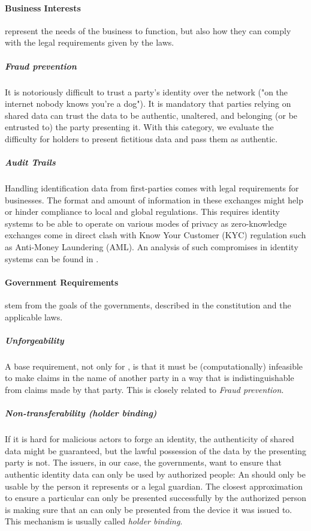 \paragraph{Business Interests} represent the needs of the business to function, but also how they can comply with the legal requirements given by the laws.

\subparagraph{Fraud prevention} It is notoriously difficult to trust a party's identity over the network ("on the internet nobody knows you're a dog"). It is mandatory that parties relying on shared data can trust the data to be authentic, unaltered, and belonging (or be entrusted to) the party presenting it. With this category, we evaluate the difficulty for holders to present fictitious data and pass them as authentic.

\subparagraph{Audit Trails} Handling identification data from first-parties comes with legal requirements for businesses. The format and amount of information in these exchanges might help or hinder compliance to local and global regulations. This requires identity systems to be able to operate on various modes of privacy as zero-knowledge exchanges come in direct clash with Know Your Customer (KYC) regulation such as Anti-Money Laundering (AML). An analysis of such compromises in identity systems can be found in \cite{ABCD25}.

\paragraph{Government Requirements} stem from the goals of the governments, described in the constitution and the applicable laws.

\subparagraph{Unforgeability} A base requirement, not only for \eid, is that it must be (computationally) infeasible to make claims in the name of another party in a way that is indistinguishable from claims made by that party. This is closely related to \emph{Fraud prevention}.

\subparagraph{Non-transferability (holder binding)} If it is hard for malicious actors to forge an identity, the authenticity of shared data might be guaranteed, but the lawful possession of the data by the presenting party is not. The issuers, in our case, the governments, want to ensure that authentic identity data can only be used by authorized people: An \eid should only be usable by the person it represents or a legal guardian. The closest approximation to ensure a particular \eid can only be presented successfully by the authorized person is making sure that an \eid can only be presented from the device it was issued to. This mechanism is usually called \emph{holder binding}.

